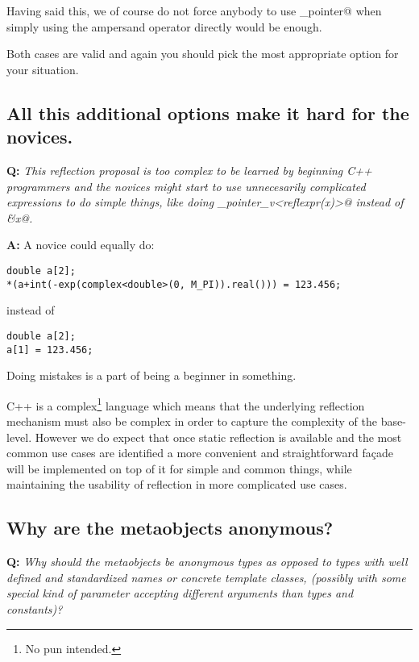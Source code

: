 Having said this, we of course do not force anybody to use \verb@get_pointer@
when simply using the ampersand operator directly would be enough.

Both cases are valid and again you should pick the most appropriate option
for your situation.

\subsection{All this additional options make it hard for the novices.}

\textbf{Q:} {\em This reflection proposal is too complex to be learned by
beginning C++ programmers and the novices might start to use unnecesarily
complicated expressions to do simple things, like doing
\verb@get_pointer_v<reflexpr(x)>@ instead of \verb@&x@.}

\textbf{A:} 
A novice could equally do:

\begin{verbatim}
double a[2];
*(a+int(-exp(complex<double>(0, M_PI)).real())) = 123.456;
\end{verbatim}

instead of

\begin{verbatim}
double a[2];
a[1] = 123.456;
\end{verbatim}

Doing mistakes is a part of being a beginner in something.

C++ is a complex\footnote{No pun intended.} language which means that
the underlying reflection mechanism must also be complex in order to capture
the complexity of the base-level.
However we do expect that once static reflection is available and the most
common use cases are identified a more convenient and straightforward
fa\c{c}ade will be implemented on top of it for simple and common things,
while maintaining the usability of reflection in more complicated use cases.

\subsection{Why are the metaobjects anonymous?}

\textbf{Q:} {\em Why should the metaobjects be anonymous types as opposed to
types with well defined and standardized names or concrete template classes, (possibly with some
special kind of parameter accepting different arguments than types and constants)?}

